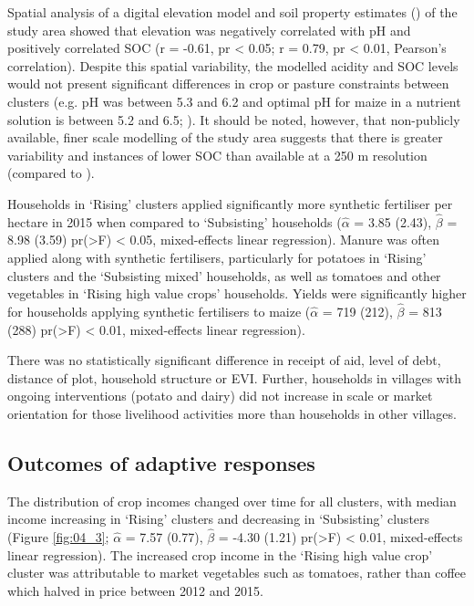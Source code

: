 Spatial analysis of a digital elevation model and soil property estimates (\citealp{Hengl2016}) of the study area showed that elevation was negatively correlated with pH and positively correlated SOC (r = -0.61, pr {\textless} 0.05; r = 0.79, pr {\textless} 0.01, Pearson's correlation). Despite this spatial variability, the modelled acidity and SOC levels would not present significant differences in crop or pasture constraints between clusters (e.g. pH was between 5.3 and 6.2 and optimal pH for maize in a nutrient solution is between 5.2 and 6.5; \citealp{Islam1980339}). It should be noted, however, that non-publicly available, finer scale modelling of the study area suggests that there is greater variability and instances of lower SOC than available at a 250 m resolution (compared to \citealp{Winowiecki2016263}).

Households in `Rising' clusters applied significantly more synthetic fertiliser per hectare in 2015 when compared to `Subsisting' households ($\hat{\alpha}$ = 3.85 (2.43), $\hat{\beta}$ = 8.98 (3.59) pr(\textgreater{\textbar}F{\textbar}) {\textless} 0.05, mixed-effects linear regression). Manure was often applied along with synthetic fertilisers, particularly for potatoes in `Rising' clusters and the `Subsisting mixed' households, as well as tomatoes and other vegetables in `Rising high value crops' households. Yields were significantly higher for households applying synthetic fertilisers to maize ($\hat{\alpha}$ = 719 (212), $\hat{\beta}$ = 813 (288) pr(\textgreater{\textbar}F{\textbar}) {\textless} 0.01, mixed-effects linear regression).

There was no statistically significant difference in receipt of aid, level of debt, distance of plot, household structure or EVI. Further, households in villages with ongoing interventions (potato and dairy) did not increase in scale or market orientation for those livelihood activities more than households in other villages.

\subsection{Outcomes of adaptive responses}

The distribution of crop incomes changed over time for all clusters, with median income increasing in `Rising' clusters and decreasing in `Subsisting' clusters (Figure \ref{fig:04_3}; $\hat{\alpha}$ = 7.57 (0.77), $\hat{\beta}$ = -4.30 (1.21) pr(\textgreater{\textbar}F{\textbar}) {\textless} 0.01, mixed-effects linear regression). The increased crop income in the `Rising high value crop' cluster was attributable to market vegetables such as tomatoes, rather than coffee which halved in price between 2012 and 2015.


